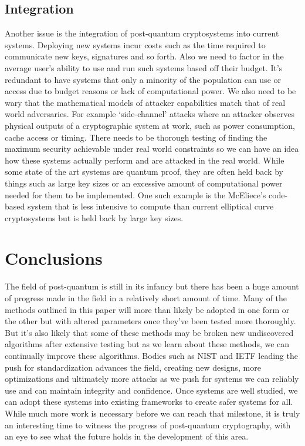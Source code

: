 \documentclass[10pt,a4paper]{IEEEtran}
\begin{document}
\subsection{Integration}
Another issue is the integration of post-quantum cryptosystems into current systems. Deploying new systems incur costs such as the time required to communicate new keys, signatures and so forth. Also we need to factor in the average user's ability to use and run such systems based off their budget. It's redundant to have systems that only a minority of the population can use or access due to budget reasons or lack of computational power.
\newline
We also need to be wary that the mathematical models of attacker capabilities match that of real world adversaries. For example `side-channel' attacks where an attacker observes physical outputs of a cryptographic system at work, such as power consumption, cache access or timing. There needs to be thorough testing of finding the maximum security achievable under real world constraints so we can have an idea how these systems actually perform and are attacked in the real world.
\newline
While some state of the art systems are quantum proof, they are often held back by things such as large key sizes or an excessive amount of computational power needed for them to be implemented. One such example is the McEliece's code-based system that is less intensive to compute than current elliptical curve cryptosystems but is held back by large key sizes.

\section{Conclusions}
The field of post-quantum is still in its infancy but there has been a huge amount of progress made in the field in a relatively short amount of time. Many of the methods outlined in this paper will more than likely be adopted in one form or the other but with altered parameters once they've been tested more thoroughly. But it's also likely that some of these methods may be broken new undiscovered algorithms after extensive testing but as we learn about these methods, we can continually improve these algorithms. Bodies such as NIST and IETF leading the push for standardization advances the field, creating new designs, more optimizations and ultimately more attacks as we push for systems we can reliably use and can maintain integrity and confidence. Once systems are well studied, we can adopt these systems into existing frameworks to create safer systems for all. While much more work is necessary before we can reach that milestone, it is truly an interesting time to witness the progress of post-quantum cryptography, with an eye to see what the future holds in the development of this area.
 

\end{document}
